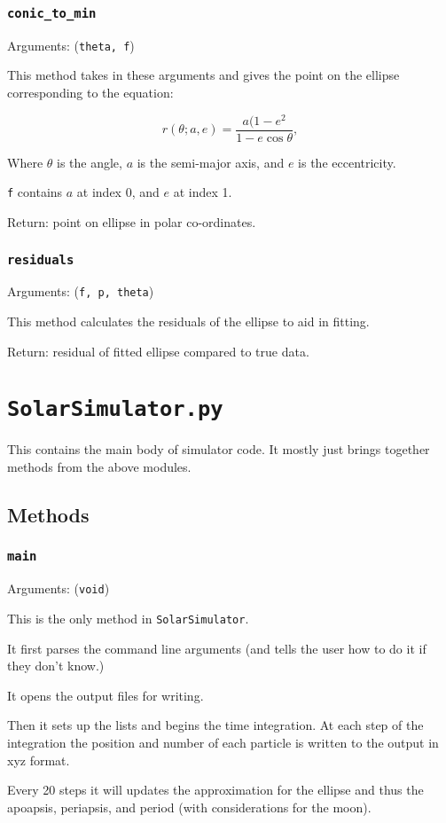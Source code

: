 \documentclass[a4paper, 11pt, british, left=1in, right=1in, top=0.3in, bottom=1in]{article}
\begin{document}
	
	\subsubsection{\texttt{conic\_to\_min}}
	Arguments: (\texttt{theta, f})
	
	This method takes in these arguments and gives the point on the ellipse corresponding to the equation: 
	
	
	$$r(\theta;a, e) = \frac{a(1-e^2}{1-e\cos\theta},$$
	
	Where $\theta$ is the angle, $a$ is the semi-major axis, and $e$ is the eccentricity.
	
	\texttt{f} contains $a$ at index 0, and $e$ at index 1.
	
	Return: point on ellipse in polar co-ordinates. 
	
	\subsubsection{\texttt{residuals}}
	
	Arguments: (\texttt{f, p, theta})
	
	This method calculates the residuals of the ellipse to aid in fitting. 
	
	Return: residual of fitted ellipse compared to true data.
	
	\section{\texttt{SolarSimulator.py}}
	
	This contains the main body of simulator code. It mostly just brings together methods from the above modules. 
	
	\subsection{Methods}
	
	\subsubsection{\texttt{main}}
	
	Arguments: (\texttt{void})
	
	This is the only method in \texttt{SolarSimulator}.
	
	It first parses the command line arguments (and tells the user how to do it if they don't know.) 
	
	It opens the output files for writing.
	
	Then it sets up the lists and begins the time integration. At each step of the integration the position and number of each particle is written to the output in xyz format. 
	
	Every 20 steps it will updates the approximation for the ellipse and thus the apoapsis, periapsis, and period (with considerations for the moon). 
\end{document}
